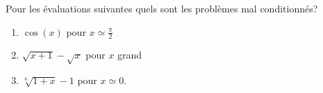 
\begin{exercice}\label{exoSerieQuatre0008}

Pour les évaluations suivantes quels sont les problèmes mal conditionnés?
\begin{enumerate}

	\item
		$\cos(x)$ pour $x\simeq\frac{\pi}{2}$
	\item
		$\sqrt{x+1}-\sqrt{x}$ pour $x$ grand
	\item
		$\sqrt[6]{1+x}-1$ pour $x\simeq 0$.

\end{enumerate}

\end{exercice}
